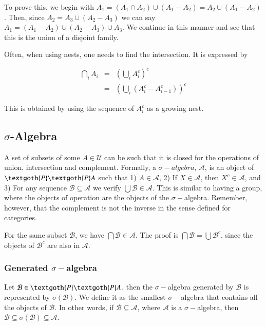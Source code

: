 \documentclass [12pt]{book}
\begin{document}
To prove this, we begin with $A_{1}=(A_{1}\cap A_{2})\cup(A_{1}-A_{2})= A_{2}\cup(A_{1}-A_{2})$. Then, since $A_{2}=A_{3}\cup(A_{2}-A_{3})$ we can say $A_{1}=(A_{1}-A_{2})\cup(A_{2}-A_{3})\cup A_{3}$. We continue in this manner and see that this is the union of a disjoint family.

Often, when using nests, one needs to find the intersection. It is expressed by

\begin{eqnarray}\nonumber\bigcap_iA_{i}&=&\left(\bigcup_iA_i^c\right)^c\\&=&
\left(\bigcup_i(A_{i}^c-A_{i-1}^c)\right)^c\end{eqnarray}

This is obtained by using the sequence of $A_i^c$ as a growing nest.

	\subsection{$\sigma$-Algebra}

A set of subsets of some $A\in\mathcal{U}$ can be such that it is closed for the operations of union, intersection and complement. Formally, a $\sigma-algebra$, $\mathcal{A}$, is an object of $\textgoth{P}\textgoth{P}A$ such that 1) $A\in\mathcal{A}$, 2) If $X\in\mathcal{A}$, then $X^c\in\mathcal{A}$, and 3) For any sequence $\mathcal{B}\subseteq\mathcal{A}$ we verify $\bigcup\mathcal{B}\in\mathcal{A}$. This is similar to having a group, where the objects of operation are the objects of the $\sigma-$algebra. Remember, however, that the complement is not the inverse in the sense defined for categories.

For the same subset $\mathcal{B}$, we have $\bigcap\mathcal{B}\in\mathcal{A}$. The proof is $\bigcap\mathcal{B}=\bigcup\mathcal{B}^c$, since the objects of $\mathcal{B}^c$ are also in $\mathcal{A}$.

		\subsubsection{Generated $\sigma-$algebra}

Let $\mathcal{B}\in\textgoth{P}\textgoth{P}A$, then the $\sigma-$algebra generated by $\mathcal{B}$ is represented by $\sigma(\mathcal{B})$. We define it as the smallest $\sigma-$algebra that contains all the objects of $\mathcal{B}$. In other words, if $\mathcal{B}\subseteq\mathcal{A}$, where $\mathcal{A}$ is a $\sigma-$algebra, then $\mathcal{B}\subseteq\sigma(\mathcal{B})\subseteq\mathcal{A}$.
\end{document}
